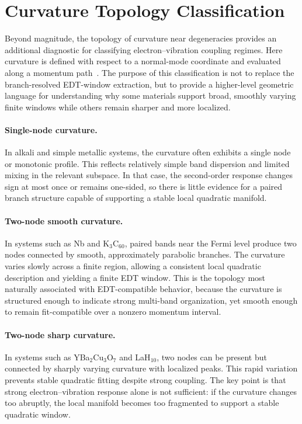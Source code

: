 ﻿\documentclass[aps,prx,reprint,superscriptaddress,longbibliography,floatfix]{revtex4-2}
\begin{document}
\section{Curvature Topology Classification}

Beyond magnitude, the topology of curvature near degeneracies provides an
additional diagnostic for classifying electron--vibration coupling regimes.
Here curvature is defined with respect to a normal-mode coordinate and evaluated
along a momentum path~\cite{Giustino2017,Yarkony1996}. The purpose of this
classification is not to replace the branch-resolved EDT-window extraction, but
to provide a higher-level geometric language for understanding why some
materials support broad, smoothly varying finite windows while others remain
sharper and more localized.

\paragraph*{Single-node curvature.}
In alkali and simple metallic systems, the curvature often exhibits a single
node or monotonic profile. This reflects relatively simple band dispersion and
limited mixing in the relevant subspace. In that case, the second-order
response changes sign at most once or remains one-sided, so there is little
evidence for a paired branch structure capable of supporting a stable local
quadratic manifold.

\paragraph*{Two-node smooth curvature.}
In systems such as Nb and K$_3$C$_{60}$, paired bands near the Fermi level
produce two nodes connected by smooth, approximately parabolic branches. The
curvature varies slowly across a finite region, allowing a consistent local
quadratic description and yielding a finite EDT window. This is the topology
most naturally associated with EDT-compatible behavior, because the curvature is
structured enough to indicate strong multi-band organization, yet smooth enough
to remain fit-compatible over a nonzero momentum interval.

\paragraph*{Two-node sharp curvature.}
In systems such as YBa$_2$Cu$_3$O$_7$ and LaH$_{10}$, two nodes can be present
but connected by sharply varying curvature with localized peaks. This rapid
variation prevents stable quadratic fitting despite strong coupling. The key
point is that strong electron--vibration response alone is not sufficient: if
the curvature changes too abruptly, the local manifold becomes too fragmented
to support a stable quadratic window.
\end{document}
